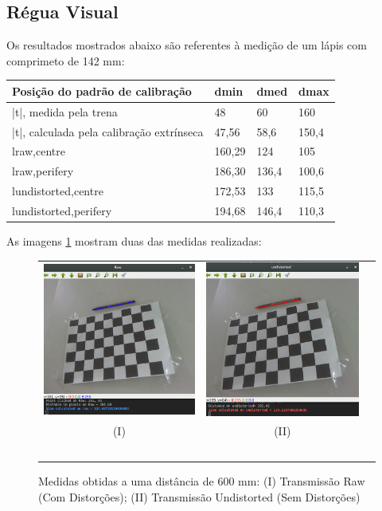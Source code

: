 \documentclass{bmvc2k}
\begin{document}
\subsection{Régua Visual}
Os resultados mostrados abaixo são referentes à medição de um lápis com comprimeto de 142 mm:
\begin{table}[H]
\centering
\begin{tabular}{|l|l|l|l|}
\hline
Posição do padrão de calibração           & dmin   & dmed  & dmax  \\ \hline
|t|, medida pela trena                    & 48     & 60   & 160   \\ \hline
|t|, calculada pela calibração extrínseca & 47,56  & 58,6 & 150,4 \\ \hline
lraw,centre                               & 160,29 & 124   & 105   \\ \hline
lraw,perifery                             & 186,30 & 136,4 & 100,6 \\ \hline
lundistorted,centre                       & 172,53 & 133   & 115,5 \\ \hline
lundistorted,perifery                     & 194,68 & 146,4 & 110,3 \\ \hline
\end{tabular}
\end{table}
As imagens \ref{fig:Medidas} mostram duas das medidas realizadas:
\begin{figure}[H]
    \centering
    \begin{tabular}{ccc}
    \includegraphics[width=.28\textwidth]{Figs/Dado2.png}&
    \includegraphics[width=.28\textwidth]{Figs/Dado1.png}\\
    (I)&(II)\\\
    \end{tabular}
    \caption{Medidas obtidas a uma distância de 600 mm:  (I) Transmissão Raw (Com Distorções); (II) Transmissão Undistorted (Sem Distorções)}
    \label{fig:Medidas}
\end{figure}
\end{document}

